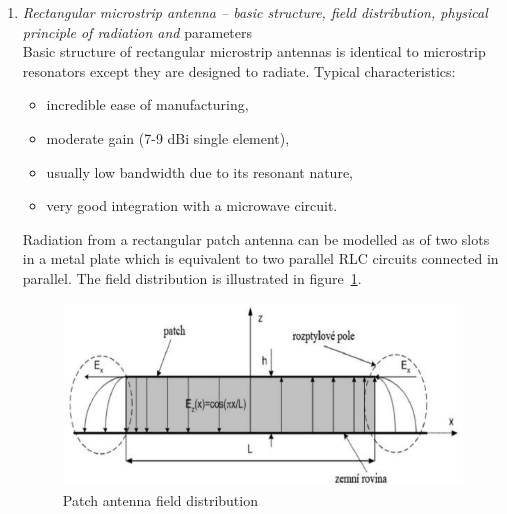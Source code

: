 \documentclass[11pt,a4paper]{article}
\begin{document}
\begin{enumerate}
    \item \emph{Rectangular microstrip antenna -- basic structure, field distribution, physical principle of radiation and }parameters\\
    Basic structure of rectangular microstrip antennas is identical to microstrip resonators except they are designed to radiate. Typical characteristics:
    \begin{itemize}
        \item incredible ease of manufacturing,
        \item moderate gain (7-9 dBi single element),
        \item usually low bandwidth due to its resonant nature,
        \item very good integration with a microwave circuit.
    \end{itemize}
    Radiation from a rectangular patch antenna can be modelled as of two slots in a metal plate which is equivalent to two parallel RLC circuits connected in parallel. The field distribution is illustrated in figure~\ref{fig:microstrip-field-distribution}.
    \begin{figure}[!ht]
        \centering
        \includegraphics[width=.6\textwidth]{src/microstrip-field-distribution.png}
        \caption{\label{fig:microstrip-field-distribution}Patch antenna field distribution}
    \end{figure}
    

\end{enumerate}
\end{document}

